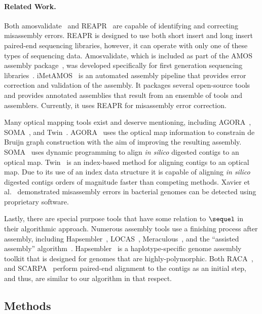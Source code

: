 \documentclass[doctor]{thesis}
\begin{document}
\paragraph{Related Work.}  
Both amosvalidate~\cite{amos} and REAPR~\cite{reapr} are capable of identifying and correcting misassembly errors.  
REAPR is designed to use both short insert and long insert paired-end sequencing libraries, however, it can operate with only one of these types of sequencing data.  
Amosvalidate, which is included as part of the AMOS assembly package~\cite{amos2}, was developed specifically for first generation sequencing libraries~\cite{amos}. 
iMetAMOS~\cite{iMetAMOS} is an automated assembly pipeline that provides error correction and validation of the assembly.  
It packages several open-source tools and provides annotated assemblies that result from an ensemble of tools and assemblers.  
Currently, it uses REAPR for misassembly error correction. 
 
Many optical mapping tools exist and deserve mentioning, including AGORA~\cite{agora}, SOMA~\cite{soma}, and Twin~\cite{wabi2014}. AGORA~\cite{agora} uses the optical map information to constrain de Bruijn graph construction with the aim of improving the resulting assembly.   SOMA~\cite{soma} uses dynamic programming to align {\em in silico} digested contigs to an optical map.   Twin~\cite{wabi2014} is an index-based method for aligning contigs to an optical map. Due to its use of an index data structure it is capable of aligning {\em in silico} digested contigs orders of magnitude faster than competing methods.     Xavier et al.~\cite{om_mis} demonstrated misassembly errors in bacterial genomes can be detected using proprietary software.

Lastly, there are special purpose tools that have some relation to $\sequel$ in their algorithmic approach.
Numerous assembly tools use a finishing process after assembly, including Hapsembler~\cite{Donmez2011}, LOCAS~\cite{LOCAS}, Meraculous~\cite{Chapman2011}, and the ``assisted assembly'' algorithm~\cite{Gnerre2009}. Hapsembler~\cite{Donmez2011} is a haplotype-specific genome assembly toolkit that is designed for genomes that are highly-polymorphic. Both RACA~\cite{raca}, and SCARPA~\cite{scarpa} perform paired-end alignment to the contigs as an initial step, and thus, are similar to our algorithm in that respect. 






 
\makeatletter{}\subsection{Methods}\label{sec-methods} 
\end{document}

